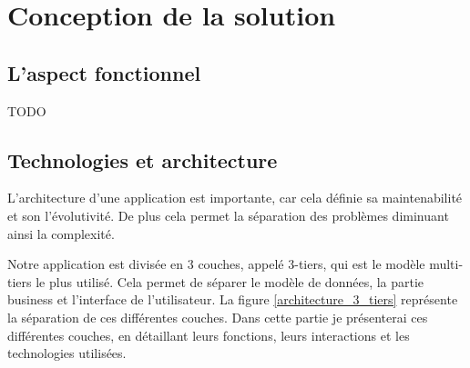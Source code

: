 \cleardoublepage

\chapter{Conception de la solution}


\section{L'aspect fonctionnel}

TODO


\section{Technologies et architecture}

L'architecture d'une application est importante, car cela définie sa maintenabilité et son l'évolutivité. De plus cela permet la séparation des problèmes diminuant ainsi la complexité.

Notre application est divisée en 3 couches, appelé 3-tiers, qui est le modèle multi-tiers le plus utilisé. Cela permet de séparer le modèle de données, la partie business et l'interface de l'utilisateur. La figure \ref{architecture_3_tiers} représente la séparation de ces différentes couches. Dans cette partie je présenterai ces différentes couches, en détaillant leurs fonctions, leurs interactions et les technologies utilisées.


